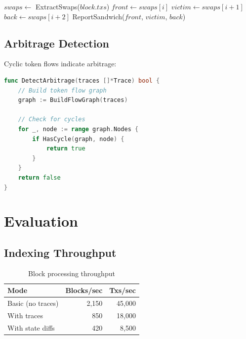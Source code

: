 \documentclass[11pt,twocolumn]{article}
\begin{document}
\begin{algorithm}
\caption{Sandwich Attack Detection}
\begin{algorithmic}[1]
    \State $swaps \gets$ ExtractSwaps($block.txs$)
        \State $front \gets swaps[i]$
        \State $victim \gets swaps[i+1]$
        \State $back \gets swaps[i+2]$
                    \State ReportSandwich($front$, $victim$, $back$)
                \EndIf
            \EndIf
        \EndIf
    \EndFor
\EndProcedure
\end{algorithmic}
\end{algorithm}

\subsection{Arbitrage Detection}

Cyclic token flows indicate arbitrage:

\begin{lstlisting}[language=Go,caption={Arbitrage detection}]
func DetectArbitrage(traces []*Trace) bool {
    // Build token flow graph
    graph := BuildFlowGraph(traces)

    // Check for cycles
    for _, node := range graph.Nodes {
        if HasCycle(graph, node) {
            return true
        }
    }
    return false
}
\end{lstlisting}

\section{Evaluation}

\subsection{Indexing Throughput}

\begin{table}[h]
\centering
\caption{Block processing throughput}
\begin{tabular}{@{}lrr@{}}
\toprule
Mode & Blocks/sec & Txs/sec \\
\midrule
Basic (no traces) & 2,150 & 45,000 \\
With traces & 850 & 18,000 \\
With state diffs & 420 & 8,500 \\
\bottomrule
\end{tabular}
\label{tab:evm-throughput}
\end{table}
\end{document}
